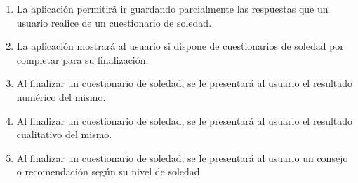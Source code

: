 \begin{enumerate}[resume=req-usuario,label=\textbf{\texttt{RU-\arabic*}}]
\begin{enumerate}[resume=req-funcionales,label=\textbf{\texttt{RF-\arabic*}}]
                \item \label{req:funcionales:soledad_cuestionario_aplazar} La aplicación permitirá ir guardando parcialmente las respuestas que un usuario realice de un cuestionario de soledad.
                \item \label{req:funcionales:soledad_cuestionario_pendientes} La aplicación mostrará al usuario si dispone de cuestionarios de soledad por completar para su finalización.
                \item \label{req:funcionales:soledad_cuestionario_numero} Al finalizar un cuestionario de soledad, se le presentará al usuario el resultado numérico del mismo.
                \item \label{req:funcionales:soledad_cuestionario_categoria} Al finalizar un cuestionario de soledad, se le presentará al usuario el resultado cualitativo del mismo.
                \item \label{req:funcionales:soledad_cuestionario_consejo} Al finalizar un cuestionario de soledad, se le presentará al usuario un consejo o recomendación según su nivel de soledad.
            \end{enumerate}
        \end{enumerate}
